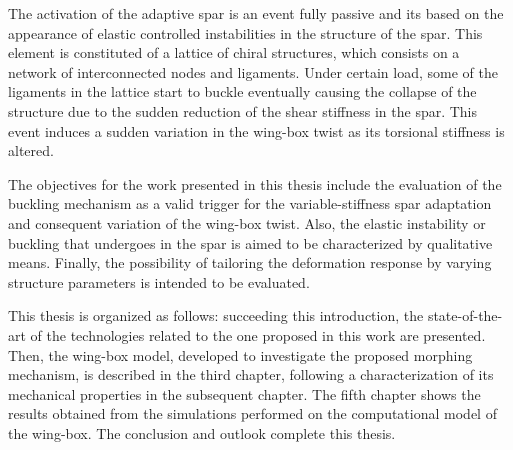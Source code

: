 The activation of the adaptive spar is an event fully passive and its based on the appearance of elastic controlled instabilities in the structure of the spar. This element is constituted of a lattice of chiral structures, which consists on a network of interconnected nodes and ligaments. Under certain load, some of the ligaments in the lattice start to buckle eventually causing the collapse of the structure due to the sudden reduction of the shear stiffness in the spar. This event induces a sudden variation in the wing-box twist as its torsional stiffness is altered.

The objectives for the work presented in this thesis include the evaluation of the buckling mechanism as a valid trigger for the variable-stiffness spar adaptation and consequent variation of the wing-box twist. Also, the elastic instability or buckling that undergoes in the spar is aimed to be characterized by qualitative means. Finally, the possibility of tailoring the deformation response by varying structure parameters is intended to be evaluated. 

This thesis is organized as follows: succeeding this introduction, the state-of-the-art of the technologies related to the one proposed in this work are presented. Then, the wing-box model, developed to investigate the proposed morphing mechanism, is described in the third chapter, following a characterization of its mechanical properties in the subsequent chapter. The fifth chapter shows the results obtained from the simulations performed on the computational model of the wing-box. The conclusion and outlook complete this thesis.